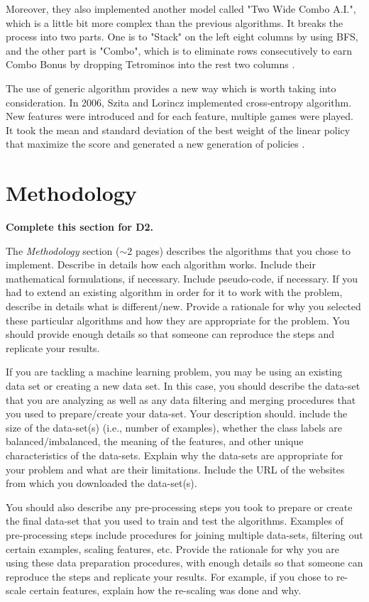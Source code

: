 \documentclass[letterpaper]{article} %
\begin{document}
Moreover, they also implemented another model called "Two Wide Combo A.I.", which is a little bit more complex than the previous algorithms. It breaks the process into two parts. One is to "Stack" on the left eight columns by using BFS, and the other part is "Combo", which is to eliminate rows consecutively to earn Combo Bonus by dropping Tetrominos into the rest two columns \cite{WCWT}.

The use of generic algorithm provides a new way which is worth taking into consideration. In 2006, Szita and Lorincz implemented cross-entropy algorithm. New features were introduced and for each feature, multiple games were played. It took the mean and standard deviation of the best weight of the linear policy that maximize the score and generated a new generation of policies \cite{SO19}.


\section{Methodology}

{\bf Complete this section for D2.}

The {\it Methodology } section ($\sim$2 pages) describes the algorithms that you chose to implement.  Describe in details how each algorithm works.  Include their mathematical formulations, if necessary.  Include pseudo-code, if necessary.  If you had to extend an existing algorithm in order for it to work with the problem, describe in details what is different/new.  Provide a rationale for why you selected these particular algorithms and how they are appropriate for the problem.  You should provide enough details so that someone can reproduce the steps and replicate your results.  

If you are tackling a machine learning problem, you may be using an existing data set or creating a new data set.  In this case, you should describe the data-set that you are analyzing as well as any data filtering and merging procedures that you used to prepare/create your data-set.  Your description should. include the size of the data-set(s) (i.e., number of examples), whether the class labels are balanced/imbalanced, the meaning of the features, and other unique characteristics of the data-sets.   Explain why the data-sets are appropriate for your problem and what are their limitations.  Include the URL of the websites from which you downloaded the data-set(s).

You should also describe any pre-processing steps you took to prepare or create the final data-set that you used to train and test the algorithms.  Examples of pre-processing steps include procedures for joining multiple data-sets, filtering out certain examples, scaling features, etc.  Provide the rationale for why you are using these data preparation procedures, with enough details so that someone can reproduce the steps and replicate your results.   For example, if you chose to re-scale certain features, explain how the re-scaling was done and why.   
\end{document}
